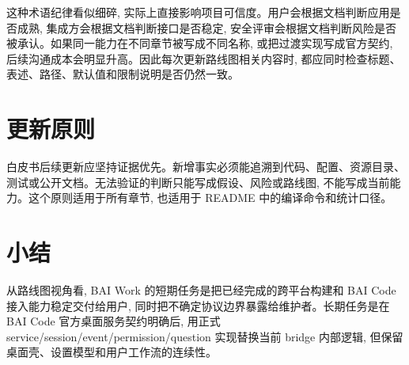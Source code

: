 这种术语纪律看似细碎, 实际上直接影响项目可信度。用户会根据文档判断应用是否成熟, 集成方会根据文档判断接口是否稳定, 安全评审会根据文档判断风险是否被承认。如果同一能力在不同章节被写成不同名称, 或把过渡实现写成官方契约, 后续沟通成本会明显升高。因此每次更新路线图相关内容时, 都应同时检查标题、表述、路径、默认值和限制说明是否仍然一致。

\section{更新原则}
白皮书后续更新应坚持证据优先。新增事实必须能追溯到代码、配置、资源目录、测试或公开文档。无法验证的判断只能写成假设、风险或路线图, 不能写成当前能力。这个原则适用于所有章节, 也适用于 README 中的编译命令和统计口径。

\section{小结}
从路线图视角看, BAI Work 的短期任务是把已经完成的跨平台构建和 BAI Code 接入能力稳定交付给用户, 同时把不确定协议边界暴露给维护者。长期任务是在 BAI Code 官方桌面服务契约明确后, 用正式 service/session/event/permission/question 实现替换当前 bridge 内部逻辑, 但保留桌面壳、设置模型和用户工作流的连续性。
